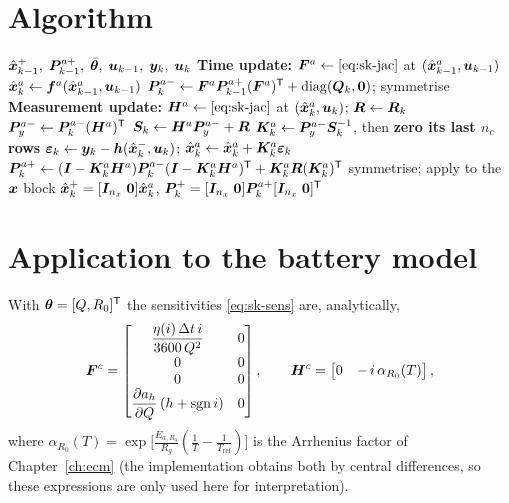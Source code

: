 \section{Algorithm}
\begin{algorithm}[H]
\caption{Schmidt-KF --- one sampling period}
\begin{algorithmic}[1]
\Require $\hat{\bm{x}}^{+}_{k-1},\;\bm{P}^{a+}_{k-1},\;\bar{\bm{\theta}},\;\bm{u}_{k-1},\;\bm{y}_k,\;\bm{u}_k$
\State \textbf{Time update:}
  $\bm{F}^a \gets \eqref{eq:sk-jac}$ at $(\hat{\bm{x}}^a_{k-1},\bm{u}_{k-1})$
\State $\hat{\bm{x}}^a_k \gets \bm{f}^a(\hat{\bm{x}}^a_{k-1},\bm{u}_{k-1})$ 
\State $\bm{P}^{a-}_k \gets \bm{F}^a\bm{P}^{a+}_{k-1}(\bm{F}^a)^{\mathsf{T}} + \operatorname{diag}(\bm{Q}_k,\bm 0)$; symmetrise
\State \textbf{Measurement update:}
  $\bm{H}^a \gets \eqref{eq:sk-jac}$ at $(\hat{\bm{x}}^a_k,\bm{u}_k)$; $\bm{R}\gets\bm{R}_k$
\State $\bm{P}^{a-}_{y}\gets \bm{P}^{a-}_k(\bm{H}^a)^{\mathsf{T}}$ 
\State $\bm{S}_k \gets \bm{H}^a\bm{P}^{a-}_{y} + \bm{R}$ 
\State $\bm{K}^a_k \gets \bm{P}^{a-}_{y}\bm{S}_k^{-1}$, then \textbf{zero its last $n_c$ rows}
\State $\bm{\varepsilon}_k \gets \bm{y}_k - \bm{h}(\hat{\bm{x}}^{-}_k,\bm{u}_k)$;\quad
       $\hat{\bm{x}}^a_k \gets \hat{\bm{x}}^a_k + \bm{K}^a_k\bm{\varepsilon}_k$
\State $\bm{P}^{a+}_k \gets (\bm{I}-\bm{K}^a_k\bm{H}^a)\bm{P}^{a-}_k(\bm{I}-\bm{K}^a_k\bm{H}^a)^{\mathsf{T}}+\bm{K}^a_k\bm{R}(\bm{K}^a_k)^{\mathsf{T}}$
\State symmetrise; apply  to the $\bm{x}$ block
\Ensure $\hat{\bm{x}}^{+}_k = [\bm{I}_{n_x}\;\bm 0]\hat{\bm{x}}^a_k$,\quad
        $\bm{P}^{+}_k = [\bm{I}_{n_x}\;\bm 0]\bm{P}^{a+}_k[\bm{I}_{n_x}\;\bm 0]^{\mathsf{T}}$
\end{algorithmic}
\end{algorithm}

\section{Application to the battery model}
With $\bm{\theta}=[Q,R_0]^{\mathsf{T}}$ the sensitivities \eqref{eq:sk-sens} are, analytically,
\begin{equation}
\bm{F}^{c} = \begin{bmatrix}
 \dfrac{\eta(i)\,\Delta t\, i}{3600\,Q^{2}} & 0\\[4pt] 0&0\\ 0&0\\
 \dfrac{\partial a_h}{\partial Q}\,(h+\operatorname{sgn} i) & 0
\end{bmatrix},
\qquad
\bm{H}^{c} = \begin{bmatrix} 0 & -\,i\,\alpha_{R_0}(T)\end{bmatrix},
\label{eq:sk-batt}
\end{equation}
where $\alpha_{R_0}(T)=\exp\!\big[\tfrac{E_{a,R_0}}{R_g}(\tfrac1T-\tfrac1{T_{\mathrm{ref}}})\big]$
is the Arrhenius factor of Chapter~\ref{ch:ecm} (the implementation obtains both by central
differences, so these expressions are only used here for interpretation).


